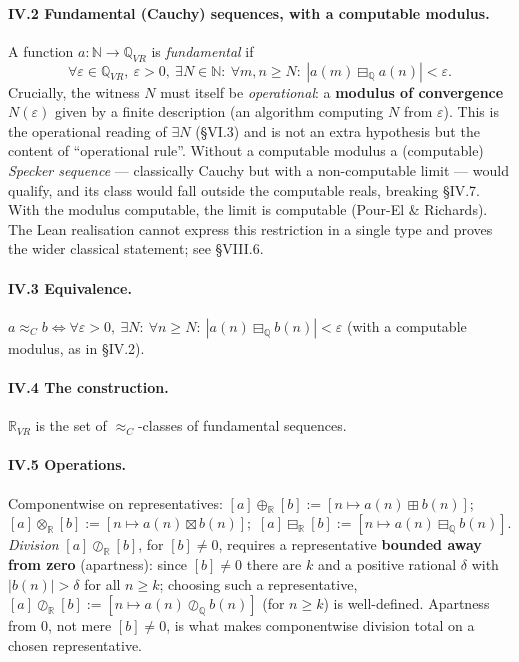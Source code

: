 \documentclass[11pt]{article}
\theoremstyle{definition}
\newcommand{\Q}{\mathbb{Q}}
\newcommand{\R}{\mathbb{R}}
\newcommand{\N}{\mathbb{N}}
\begin{document}
\paragraph{IV.2 Fundamental (Cauchy) sequences, with a computable modulus.} A function
$a:\N\to\Q_{VR}$ is \emph{fundamental} if
\[
  \forall\varepsilon\in\Q_{VR},\ \varepsilon>0,\ \exists N\in\N:\ \forall m,n\ge N:\
  |a(m)\boxminus_{\Q} a(n)|<\varepsilon.
\]
Crucially, the witness $N$ must itself be \emph{operational}: a \textbf{modulus of convergence}
$N(\varepsilon)$ given by a finite description (an algorithm computing $N$ from $\varepsilon$). This is
the operational reading of $\exists N$ (\S VI.3) and is not an extra hypothesis but the content of
``operational rule''. Without a computable modulus a (computable) \emph{Specker sequence} ---
classically Cauchy but with a non-computable limit --- would qualify, and its class would fall outside
the computable reals, breaking \S IV.7. With the modulus computable, the limit is computable
(Pour-El \& Richards). The Lean realisation cannot express this restriction in a single type and
proves the wider classical statement; see \S VIII.6.

\paragraph{IV.3 Equivalence.}
$a\approx_C b \Leftrightarrow \forall\varepsilon>0,\ \exists N:\ \forall n\ge N:\
|a(n)\boxminus_{\Q} b(n)|<\varepsilon$ (with a computable modulus, as in \S IV.2).

\paragraph{IV.4 The construction.} $\R_{VR}$ is the set of $\approx_C$-classes of fundamental sequences.

\paragraph{IV.5 Operations.} Componentwise on representatives:
$[a]\oplus_{\R}[b]:=[n\mapsto a(n)\boxplus b(n)]$;\
$[a]\otimes_{\R}[b]:=[n\mapsto a(n)\boxtimes b(n)]$;\
$[a]\boxminus_{\R}[b]:=[n\mapsto a(n)\boxminus_{\Q} b(n)]$.
\emph{Division} $[a]\oslash_{\R}[b]$, for $[b]\neq 0$, requires a representative \textbf{bounded away
from zero} (apartness): since $[b]\neq 0$ there are $k$ and a positive rational $\delta$ with
$|b(n)|>\delta$ for all $n\ge k$; choosing such a representative, $[a]\oslash_{\R}[b]:=
[n\mapsto a(n)\oslash_{\Q} b(n)]$ (for $n\ge k$) is well-defined. Apartness from $0$, not mere
$[b]\neq 0$, is what makes componentwise division total on a chosen representative.
\end{document}
